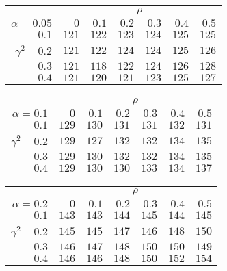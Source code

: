 \begin{tabular}{r|rrrrrr}
\hline\hline
 &\multicolumn{6}{c}{$\rho$} \\ 
 $\alpha = 0.05$ & $0$ & $0.1$ & $0.2$ & $0.3$ & $0.4$ & $0.5$ \\ 
 \hline$0.1$ & $121$ & $122$ & $123$ & $124$ & $125$ & $125$\\ 
$\gamma^2\;\;\;$ $0.2$ & $121$ & $122$ & $124$ & $124$ & $125$ & $126$\\ 
$0.3$ & $121$ & $118$ & $122$ & $124$ & $126$ & $128$\\ 
$0.4$ & $121$ & $120$ & $121$ & $123$ & $125$ & $127$\\ 
 \hline 
 \end{tabular}
 
 \vspace{2em} 
 
\begin{tabular}{r|rrrrrr}
\hline\hline
 &\multicolumn{6}{c}{$\rho$} \\ 
 $\alpha = 0.1$ & $0$ & $0.1$ & $0.2$ & $0.3$ & $0.4$ & $0.5$ \\ 
 \hline$0.1$ & $129$ & $130$ & $131$ & $131$ & $132$ & $131$\\ 
$\gamma^2\;\;\;$ $0.2$ & $129$ & $127$ & $132$ & $132$ & $134$ & $135$\\ 
$0.3$ & $129$ & $130$ & $132$ & $132$ & $134$ & $135$\\ 
$0.4$ & $129$ & $130$ & $130$ & $133$ & $134$ & $137$\\ 
 \hline 
 \end{tabular}
 
 \vspace{2em} 
 
\begin{tabular}{r|rrrrrr}
\hline\hline
 &\multicolumn{6}{c}{$\rho$} \\ 
 $\alpha = 0.2$ & $0$ & $0.1$ & $0.2$ & $0.3$ & $0.4$ & $0.5$ \\ 
 \hline$0.1$ & $143$ & $143$ & $144$ & $145$ & $144$ & $145$\\ 
$\gamma^2\;\;\;$ $0.2$ & $145$ & $145$ & $147$ & $146$ & $148$ & $150$\\ 
$0.3$ & $146$ & $147$ & $148$ & $150$ & $150$ & $149$\\ 
$0.4$ & $146$ & $146$ & $148$ & $150$ & $152$ & $154$\\ 
 \hline 
 \end{tabular}